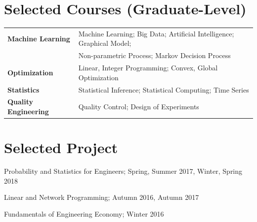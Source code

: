 \documentclass[margin,line,11pt]{resume}
\begin{document}
\begin{resume}
        \section{\mysidestyle Selected Courses (Graduate-Level)}
\vspace{0.5em}
	\begin{tabular}{ll }
          \textbf{Machine Learning} & Machine Learning; Big Data; Artificial Intelligence; Graphical Model; \\
                           &  Non-parametric Process; Markov Decision Process\\
  \textbf{Optimization} & Linear, Integer Programming; Convex,  Global Optimization \\
   \textbf{Statistics}& Statistical Inference; Statistical Computing; Time Series \\
\textbf{Quality Engineering} & Quality Control; Design of Experiments \\
	\end{tabular}

 


 \section{\mysidestyle Selected Project}
        \begin{list2}
        \item   Probability and Statistics for Engineers; Spring, Summer 2017, Winter, Spring 2018 
        \item   Linear and Network Programming; Autumn 2016, Autumn 2017
        \item  Fundamentals of Engineering Economy; Winter 2016
        \end{list2}


\end{resume}
\end{document}
